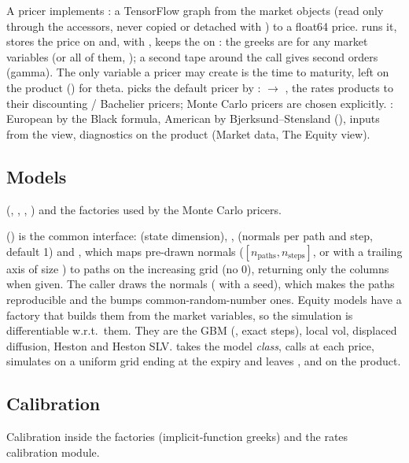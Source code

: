 A pricer implements : a TensorFlow graph from the market objects (read only
through the  accessors, never copied or detached with ) to a float64 price.
 runs it, stores the price on  and, with
, keeps the  on : the greeks are
 for any market variables (or all of them,
); a second tape around the call gives second orders (gamma). The only variable a
pricer may create is the time to maturity, left on the product () for theta.
 picks the default pricer by : 
$\to$ , the rates products to their discounting / Bachelier pricers; Monte Carlo pricers are
chosen explicitly. : European by the Black formula,
American by Bjerksund--Stensland (), inputs from the  view, diagnostics on the
product (Market data, The Equity view). 

\subsection{Models}\label{sec:arch-models}
 (, , , ) and the
 factories used by the Monte Carlo pricers.

 () is the common interface:  (state
dimension), ,  (normals per path and step, default 1) and
, which maps pre-drawn normals 
($[n_{\text{paths}}, n_{\text{steps}}]$, or with a trailing axis of size ) to paths on the increasing grid
 (no 0), returning only the  columns when given. The caller draws the normals
( with a seed), which makes the paths reproducible and the bumps common-random-number
ones. Equity models have a  factory that builds them from the market
variables, so the simulation is differentiable w.r.t.\ them. They are the GBM (,
exact steps), local vol, displaced diffusion, Heston and Heston SLV.
 takes the model \emph{class}, calls
 at each price, simulates on a uniform grid ending at the expiry and leaves
,  and  on the product. 

\subsection{Calibration}\label{sec:arch-calibration}
Calibration inside the factories (implicit-function greeks) and the rates calibration module.

\pending
